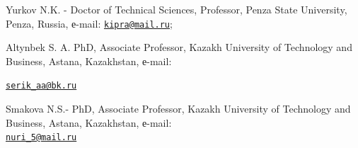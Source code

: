 \begin{authorinfo}
Yurkov N.K. - Doctor of Technical Sciences, Professor, Penza State
University, Penza, Russia, е-mail:
\href{mailto:kipra@mail.ru}{\nolinkurl{kipra@mail.ru}};

Altynbek S. A. PhD, Associate Professor, Kazakh University of Technology
and Business, Astana, Kazakhstan, е-mail:

\href{mailto:serik_aa@bk.ru}{\nolinkurl{serik\_aa@bk.ru}}

Smakova N.S.- PhD, Associate Professor, Kazakh University of Technology
and Business, Astana, Kazakhstan, е-mail: \\\href{mailto:nuri\_5@mail.ru}{\nolinkurl{nuri\_5@mail.ru}}
\end{authorinfo}
